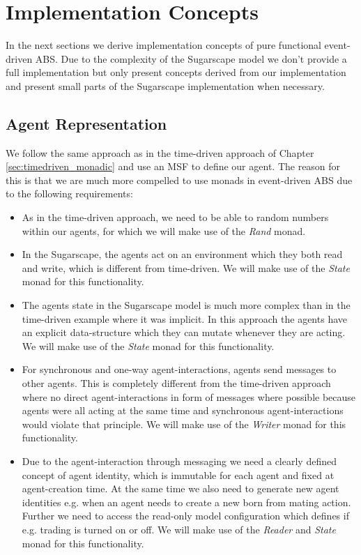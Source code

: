 \section{Implementation Concepts}
\label{sec:eventdriven_implementation}

In the next sections we derive implementation concepts of pure functional event-driven ABS. Due to the complexity of the Sugarscape model we don't provide a full implementation but only present concepts derived from our implementation and present small parts of the Sugarscape implementation when necessary.

\subsection{Agent Representation}
We follow the same approach as in the time-driven approach of Chapter \ref{sec:timedriven_monadic} and use an MSF to define our agent. The reason for this is that we are much more compelled to use monads in event-driven ABS due to the following requirements:

\begin{itemize}
	\item As in the time-driven approach, we need to be able to random numbers within our agents, for which we will make use of the  \textit{Rand} monad.
	
	\item In the Sugarscape, the agents act on an environment which they both read and write, which is different from time-driven. We will make use of the \textit{State} monad for this functionality. 
	
	\item The agents state in the Sugarscape model is much more complex than in the time-driven example where it was implicit. In this approach the agents have an explicit data-structure which they can mutate whenever they are acting. We will make use of the \textit{State} monad for this functionality.
	
	\item For synchronous and one-way agent-interactions, agents send messages to other agents. This is completely different from the time-driven approach where no direct agent-interactions in form of messages where possible because agents were all acting at the same time and synchronous agent-interactions would violate that principle. We will make use of the \textit{Writer} monad for this functionality.

	\item Due to the agent-interaction through messaging we need a clearly defined concept of agent identity, which is immutable for each agent and fixed at agent-creation time. At the same time we also need to generate new agent identities e.g. when an agent needs to create a new born from mating action. Further we need to access the read-only model configuration which defines if e.g. trading is turned on or off. We will make use of the \textit{Reader} and \textit{State} monad for this functionality.
\end{itemize}

